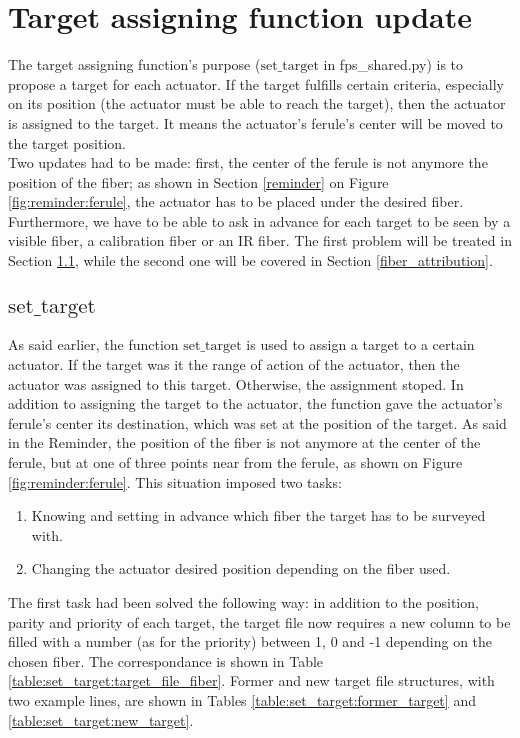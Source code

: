 \section{Target assigning function update} \label{set_target}

The target assigning function's purpose ($\textrm{set_target}$ in fps_shared.py) is to propose a target for each actuator. If the target fulfills certain criteria, especially on its position (the actuator must be able to reach the target), then the actuator is assigned to the target. It means the actuator's ferule's center will be moved to the target position.\\

Two updates had to be made: first, the center of the ferule is not anymore the position of the fiber; as shown in Section \ref{reminder} on Figure \ref{fig:reminder:ferule}, the actuator has to be placed under the desired fiber. Furthermore, we have to be able to ask in advance for each target to be seen by a visible fiber, a calibration fiber or an IR fiber. The first problem will be treated in Section \ref{set_target_1}, while the second one will be covered in Section \ref{fiber_attribution}.

\subsection{$\textrm{set_target}$} \label{set_target_1}

As said earlier, the function $\textrm{set_target}$ is used to assign a target to a certain actuator. If the target was it the range of action of the actuator, then the actuator was assigned to this target. Otherwise, the assignment stoped. In addition to assigning the target to the actuator, the function gave the actuator's ferule's center its destination, which was set at the position of the target. As said in the Reminder, the position of the fiber is not anymore at the center of the ferule, but at one of three points near from the ferule, as shown on Figure \ref{fig:reminder:ferule}. This situation imposed two tasks:

\begin{enumerate}
	\item Knowing and setting in advance which fiber the target has to be surveyed with.
	\item Changing the actuator desired position depending on the fiber used.
\end{enumerate}

The first task had been solved the following way: in addition to the position, parity and priority of each target, the target file now requires a new column to be filled with a number (as for the priority) between 1, 0 and -1 depending on the chosen fiber. The correspondance is shown in Table \ref{table:set_target:target_file_fiber}. Former and new target file structures, with two example lines, are shown in Tables \ref{table:set_target:former_target} and \ref{table:set_target:new_target}.
\\

